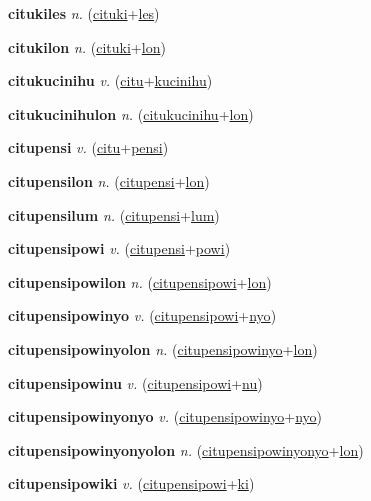 \textbf{\hypertarget{citukiles}{citukiles}} \textit{n.} (\hyperlink{cituki}{cituki}+\allowbreak \hyperlink{les}{les})


\textbf{\hypertarget{citukilon}{citukilon}} \textit{n.} (\hyperlink{cituki}{cituki}+\allowbreak \hyperlink{lon}{lon})


\textbf{\hypertarget{citukucinihu}{citukucinihu}} \textit{v.} (\hyperlink{citu}{citu}+\allowbreak \hyperlink{kucinihu}{kucinihu})


\textbf{\hypertarget{citukucinihulon}{citukucinihulon}} \textit{n.} (\hyperlink{citukucinihu}{citukucinihu}+\allowbreak \hyperlink{lon}{lon})


\textbf{\hypertarget{citupensi}{citupensi}} \textit{v.} (\hyperlink{citu}{citu}+\allowbreak \hyperlink{pensi}{pensi})


\textbf{\hypertarget{citupensilon}{citupensilon}} \textit{n.} (\hyperlink{citupensi}{citupensi}+\allowbreak \hyperlink{lon}{lon})


\textbf{\hypertarget{citupensilum}{citupensilum}} \textit{n.} (\hyperlink{citupensi}{citupensi}+\allowbreak \hyperlink{lum}{lum})


\textbf{\hypertarget{citupensipowi}{citupensipowi}} \textit{v.} (\hyperlink{citupensi}{citupensi}+\allowbreak \hyperlink{powi}{powi})


\textbf{\hypertarget{citupensipowilon}{citupensipowilon}} \textit{n.} (\hyperlink{citupensipowi}{citupensipowi}+\allowbreak \hyperlink{lon}{lon})


\textbf{\hypertarget{citupensipowinyo}{citupensipowinyo}} \textit{v.} (\hyperlink{citupensipowi}{citupensipowi}+\allowbreak \hyperlink{nyo}{nyo})


\textbf{\hypertarget{citupensipowinyolon}{citupensipowinyolon}} \textit{n.} (\hyperlink{citupensipowinyo}{citupensipowinyo}+\allowbreak \hyperlink{lon}{lon})


\textbf{\hypertarget{citupensipowinu}{citupensipowinu}} \textit{v.} (\hyperlink{citupensipowi}{citupensipowi}+\allowbreak \hyperlink{nu}{nu})


\textbf{\hypertarget{citupensipowinyonyo}{citupensipowinyonyo}} \textit{v.} (\hyperlink{citupensipowinyo}{citupensipowinyo}+\allowbreak \hyperlink{nyo}{nyo})


\textbf{\hypertarget{citupensipowinyonyolon}{citupensipowinyonyolon}} \textit{n.} (\hyperlink{citupensipowinyonyo}{citupensipowinyonyo}+\allowbreak \hyperlink{lon}{lon})


\textbf{\hypertarget{citupensipowiki}{citupensipowiki}} \textit{v.} (\hyperlink{citupensipowi}{citupensipowi}+\allowbreak \hyperlink{ki}{ki})


